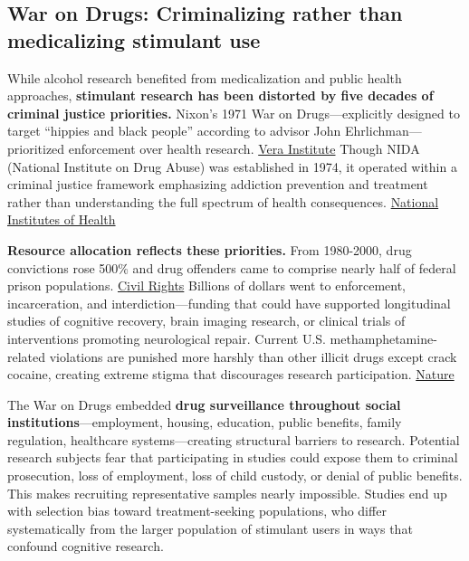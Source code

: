 \subsection{War on Drugs: Criminalizing rather than medicalizing stimulant use}\label{16_missing_syndrome-war-on-drugs-criminalizing-rather-than-medicalizing-stimulant-use}

While alcohol research benefited from medicalization and public health approaches, \textbf{stimulant research has been distorted by five decades of criminal justice priorities.} Nixon's 1971 War on Drugs---explicitly designed to target ``hippies and black people'' according to advisor John Ehrlichman---prioritized enforcement over health research. \href{https://www.vera.org/news/fifty-years-ago-today-president-nixon-declared-the-war-on-drugs}{Vera Institute} Though NIDA (National Institute on Drug Abuse) was established in 1974, it operated within a criminal justice framework emphasizing addiction prevention and treatment rather than understanding the full spectrum of health consequences. \href{https://www.nih.gov/about-nih/what-we-do/nih-almanac/national-institute-drug-abuse-nida}{National Institutes of Health}

\textbf{Resource allocation reflects these priorities.} From 1980-2000, drug convictions rose 500\% and drug offenders came to comprise nearly half of federal prison populations. \href{https://civilrights.org/blog/americas-war-on-drugs-50-years-later/}{Civil Rights} Billions of dollars went to enforcement, incarceration, and interdiction---funding that could have supported longitudinal studies of cognitive recovery, brain imaging research, or clinical trials of interventions promoting neurological repair. Current U.S. methamphetamine-related violations are punished more harshly than other illicit drugs except crack cocaine, creating extreme stigma that discourages research participation. \href{https://www.nature.com/articles/npp2011276}{Nature}

The War on Drugs embedded \textbf{drug surveillance throughout social institutions}---employment, housing, education, public benefits, family regulation, healthcare systems---creating structural barriers to research. Potential research subjects fear that participating in studies could expose them to criminal prosecution, loss of employment, loss of child custody, or denial of public benefits. This makes recruiting representative samples nearly impossible. Studies end up with selection bias toward treatment-seeking populations, who differ systematically from the larger population of stimulant users in ways that confound cognitive research.

